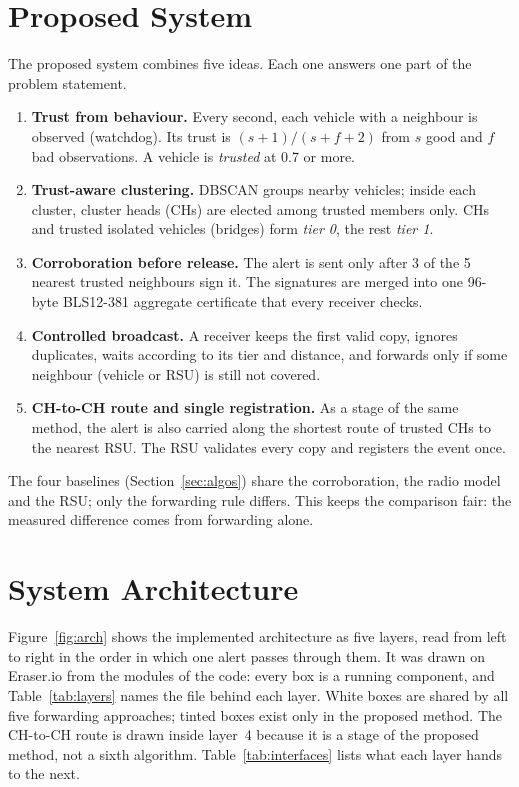 \documentclass[11pt, a4paper]{article}
\begin{document}
\section{Proposed System}
\label{sec:proposed}
The proposed system combines five ideas. Each one answers one part of the problem statement.
\begin{enumerate}[noitemsep, topsep=2pt]
  \item \textbf{Trust from behaviour.} Every second, each vehicle with a neighbour is observed (watchdog). Its trust is
        $(s+1)/(s+f+2)$ from $s$ good and $f$ bad observations. A vehicle is \emph{trusted} at 0.7 or more.
  \item \textbf{Trust-aware clustering.} DBSCAN groups nearby vehicles; inside each cluster, cluster heads (CHs) are
        elected among trusted members only. CHs and trusted isolated vehicles (bridges) form \emph{tier 0}, the rest
        \emph{tier 1}.
  \item \textbf{Corroboration before release.} The alert is sent only after 3 of the 5 nearest trusted neighbours sign
        it. The signatures are merged into one 96-byte BLS12-381 aggregate certificate that every receiver checks.
  \item \textbf{Controlled broadcast.} A receiver keeps the first valid copy, ignores duplicates, waits according to its
        tier and distance, and forwards only if some neighbour (vehicle or RSU) is still not covered.
  \item \textbf{CH-to-CH route and single registration.} As a stage of the same method, the alert is also carried along
        the shortest route of trusted CHs to the nearest RSU. The RSU validates every copy and registers the event once.
\end{enumerate}
\noindent The four baselines (Section~\ref{sec:algos}) share the corroboration, the radio model and the RSU; only the
forwarding rule differs. This keeps the comparison fair: the measured difference comes from forwarding alone.

\section{System Architecture}
\label{sec:arch}
Figure~\ref{fig:arch} shows the implemented architecture as five layers, read from left to right in the order in which
one alert passes through them. It was drawn on Eraser.io from the modules of the code: every box is a running
component, and Table~\ref{tab:layers} names the file behind each layer. White boxes are shared by all five forwarding
approaches; tinted boxes exist only in the proposed method. The CH-to-CH route is drawn inside layer~4 because it is a
stage of the proposed method, not a sixth algorithm. Table~\ref{tab:interfaces} lists what each layer hands to the
next.
\end{document}
